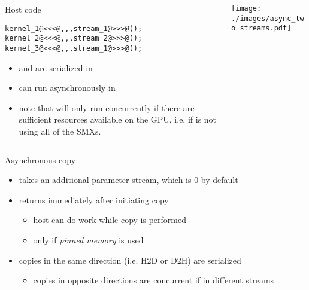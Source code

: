 \begin{frame}[fragile]{}
    \begin{columns}[T]
        \begin{column}{0.45\textwidth}
            \begin{codecolumn}{Host code}
                \begin{lstlisting}[style=boxcudatiny]
kernel_1@<<<@,,,stream_1@>>>@();
kernel_2@<<<@,,,stream_2@>>>@();
kernel_3@<<<@,,,stream_1@>>>@();
                \end{lstlisting}
            \end{codecolumn}
            \begin{itemize}
                \item \footnotesize {} and  are serialized in 
                \item {} can run asynchronously in 
                \item note that  will only run concurrently if there are sufficient resources available on the GPU, i.e. if  is not using all of the SMXs.
            \end{itemize}
        \end{column}
        \begin{column}{0.6\textwidth}
            \texttt{[image: ./images/async\_two\_streams.pdf]}
        \end{column}
    \end{columns}
\end{frame}

\begin{frame}[fragile]{}

    \begin{info}{Asynchronous copy}
        \centering {}
        \begin{itemize}
            \item takes an additional parameter stream, which is 0 by default
            \item returns immediately after initiating copy
            \begin{itemize}
                \item host can do work while copy is performed
                \item only if \emph{pinned memory} is used
            \end{itemize}
            \item copies in the same direction (i.e. H2D or D2H) are serialized
            \begin{itemize}
                \item copies in opposite directions are concurrent if in different streams
            \end{itemize}
        \end{itemize}
    \end{info}

\end{frame}

